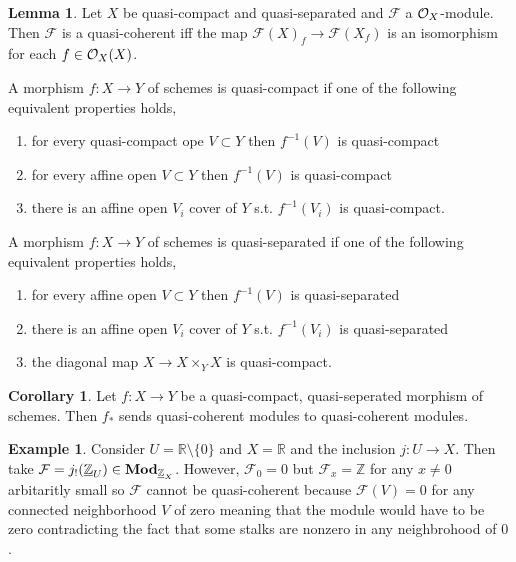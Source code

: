 \documentclass[12pt]{extarticle}
\newcommand{\Z}{\mathbb{Z}}
\newcommand{\R}{\mathbb{R}}
\theoremstyle{definition}
\newtheorem{lemma}[theorem]{Lemma}
\newtheorem{example}[theorem]{Example}
\newtheorem{corollary}[theorem]{Corollary}
\newenvironment{definition}[1][Definition:]{\begin{trivlist}
\item[\hskip \labelsep {\bfseries #1}]}{\end{trivlist}}
\newcommand{\F}{\mathcal{F}}
\begin{document}
\begin{lemma}
Let $X$ be quasi-compact and quasi-separated and $\F$ a $\mathcal{O}_{X}$-module. Then $\F$ is a quasi-coherent iff the map $\F(X)_f \to \F(X_f)$ is an isomorphism for each $f \in \mathcal{O}_{X}(X)$. 
\end{lemma}

\begin{definition}
A morphism $f : X \to Y$ of schemes is quasi-compact if one of the following equivalent properties holds,
\begin{enumerate}
\item for every quasi-compact ope $V \subset Y$ then $f^{-1}(V)$ is quasi-compact
\item for every affine open $V \subset Y$ then $f^{-1}(V)$ is quasi-compact
\item there is an affine open $V_i$ cover of $Y$ s.t. $f^{-1}(V_i)$ is quasi-compact. 
\end{enumerate}
\end{definition}

\begin{definition}
A morphism $f : X \to Y$ of schemes is quasi-separated if one of the following equivalent properties holds,
\begin{enumerate}
\item for every affine open $V \subset Y$ then $f^{-1}(V)$ is quasi-separated
\item there is an affine open $V_i$ cover of $Y$ s.t. $f^{-1}(V_i)$ is quasi-separated
\item the diagonal map $X \to X \times_Y X$ is quasi-compact. 
\end{enumerate}
\end{definition}

\begin{corollary}
Let $f : X \to Y$ be a quasi-compact, quasi-seperated morphism of schemes. Then $f_*$ sends quasi-coherent modules to quasi-coherent modules.
\end{corollary}

\begin{example}
Consider $U = \R \setminus \{ 0 \}$ and $X = \R$ and the inclusion $j : U \to X$. Then take $\F = j_{!}(\underline{\Z}_U) \in \Mod{\underline{\Z}_X}$. However, $\F_0 = 0$ but $\F_x = \Z$ for any $x \neq 0$ arbitaritly small so $\F$ cannot be quasi-coherent because $\F(V) = 0$ for any connected neighborhood $V$ of zero meaning that the module would have to be zero contradicting the fact that some stalks are nonzero in any neighbrohood of $0$. 
\end{example}
\end{document}
